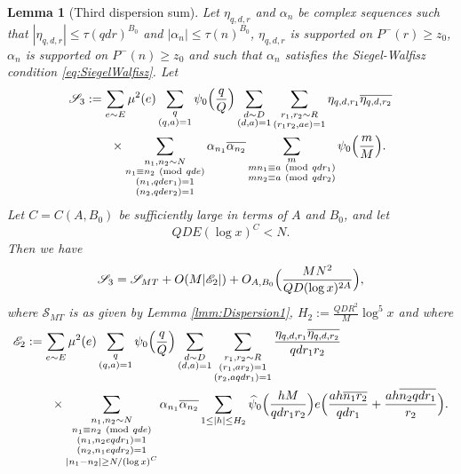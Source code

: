 \documentclass[10pt]{amsart}
\theoremstyle{plain}
\newtheorem{lmm}[thrm]{Lemma}
\numberwithin{equation}{section}
\newcommand{\Mod}[1]{\ (\mathrm{mod}\ #1)}
\renewcommand{\hat}[1]{\widehat #1}
\begin{document}
\begin{lmm}[Third dispersion sum]\label{lmm:Dispersion3}
Let $\eta_{q,d,r}$ and $\alpha_n$ be complex sequences such that $|\eta_{q,d,r}|\le \tau(q d r)^{B_0}$ and $|\alpha_n|\le \tau(n)^{B_0}$, $\eta_{q,d,r}$ is supported on $P^-(r)\ge z_0$, $\alpha_n$ is supported on $P^-(n)\ge z_0$ and such that $\alpha_n$ satisfies the Siegel-Walfisz condition \eqref{eq:SiegelWalfisz}. Let
\begin{align*}
\mathscr{S}_{3}&:=\sum_{e\sim E}\mu^2(e)\sum_{\substack{q\\ (q,a)=1}}\psi_0\Bigl(\frac{q}{Q}\Bigr)\sum_{\substack{d\sim D\\ (d,a)=1}}\sum_{\substack{r_1,r_2\sim R\\ (r_1r_2,ae)=1}}\eta_{q,d,r_1}\overline{\eta_{q,d,r_2}}\\
&\qquad\times \sum_{\substack{n_1,n_2\sim N\\ n_1\equiv n_2\Mod{qd e}\\ (n_1,q d e r_1)=1\\(n_2,q d e r_2)=1}}\alpha_{n_1}\overline{\alpha_{n_2}}\sum_{\substack{m\\ m n_1\equiv a\Mod{q d r_1}\\ m n_2\equiv a\Mod{q d r_2}}} \psi_0\Bigl(\frac{m}{M}\Bigr).
\end{align*}
Let $C=C(A,B_0)$ be sufficiently large in terms of $A$ and $B_0$, and let
\begin{equation}
Q D E(\log{x})^{C}<N.
\label{eq:DispersionCond}
\end{equation}
Then we have
\begin{equation*}
\mathscr{S}_{3}=\mathscr{S}_{MT}+O(M|\mathscr{E}_2|)+O_{A,B_0}\Bigl(\frac{MN^2}{Q D(\log{x})^{2A}}\Bigr),
\end{equation*}
where $\mathscr{S}_{MT}$ is as given by Lemma \ref{lmm:Dispersion1}, $H_2:=\frac{Q D R^2}{M}\log^5{x}$ and where
\begin{align*}
\mathscr{E}_2&:=\sum_{e\sim E}\mu^2(e)\sum_{\substack{q\\ (q,a)=1}}\psi_0\Bigl(\frac{q}{Q}\Bigr)\sum_{\substack{d\sim D\\ (d,a)=1}}\sum_{\substack{r_1,r_2\sim R\\ (r_1,a r_2)=1\\ (r_2,a q d r_1)=1}}\frac{\eta_{q,d,r_1}\overline{\eta_{q,d,r_2}}}{q d r_1 r_2}\\
&\qquad \times\sum_{\substack{n_1,n_2\sim N\\ n_1\equiv n_2\Mod{q d e}\\ (n_1,n_2 e q d r_1)=1\\(n_2,n_1 e q d r_2)=1\\ |n_1-n_2|\ge N/(\log{x})^C}}\alpha_{n_1}\overline{\alpha_{n_2}}\sum_{1\le |h|\le H_2}\hat{\psi}_0\Bigl(\frac{h M}{q d r_1 r_2}\Bigr)e\Bigl(\frac{ah\overline{n_1r_2}}{q d r_1}+\frac{ah\overline{n_2 q d r_1}}{r_2}\Bigr).
\end{align*}
\end{lmm}
\end{document}
